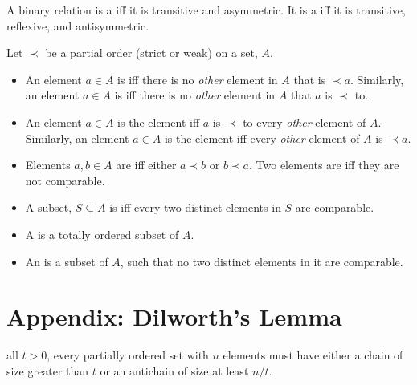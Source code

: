 \documentclass[handout]{mcs}
\begin{document}
A binary relation is a  iff it is transitive
and asymmetric.  It is a  iff it is transitive,
reflexive, and antisymmetric.

Let $\prec$ be a partial order (strict or weak) on a set, $A$.
\begin{itemize}

\item An element $a \in A$ is  iff there is no \emph{other}
  element in $A$ that is $\prec a$.  Similarly, an element $a \in A$ is
   iff there is no \emph{other} element in $A$ that $a$ is
  $\prec$ to.

\item An element $a \in A$ is the  element iff $a$ is
  $\prec$ to every \emph{other} element of $A$.  Similarly, an element $a
  \in A$ is the  element iff every \emph{other} element of
  $A$ is $\prec a$.

\item Elements $a,b \in A$ are  iff either $a \prec b$ or
  $b \prec a$.  Two elements are  iff they are not
  comparable.

\item A subset, $S \subseteq A$ is  iff every
two distinct elements in $S$ are comparable.

\item A  is a totally ordered subset of $A$.  

\item An  is a subset of $A$, such that no two distinct
  elements in it are comparable.

\iffalse
\item An element $a \in A$ is the \term{greatest lower bound (glb)} of a
subset, $S \subseteq A$ iff $a$ is a lower bound for $S$, and if $b \in A$
is also a lower bound for $S$, then $b \preceq a$.  Similarly for
\term{least upper bound (lub)}.
\fi

\iffalse
\item The partial order, $\prec$, is \term{well-founded} iff every
  nonempty subset of $A$ has at least one minimal element.
\fi

\end{itemize}

\section*{Appendix: Dilworth's Lemma}

 all $t>0$, every partially ordered set with
$n$ elements must have either a chain of size greater than $t$ or an
antichain of size at least $n / t$.
\end{document}
